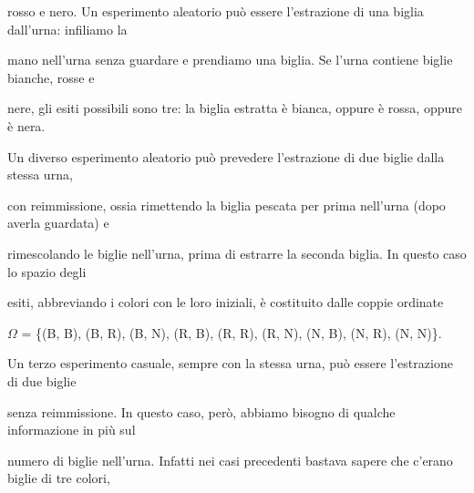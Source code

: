 \documentclass[a4paper,portrait,12pt]{article}
\begin{document}
\begin{flushleft}
rosso e nero. Un esperimento aleatorio pu\`{o} essere l'estrazione di una biglia dall'urna: infiliamo la
\end{flushleft}


\begin{flushleft}
mano nell'urna senza guardare e prendiamo una biglia. Se l'urna contiene biglie bianche, rosse e
\end{flushleft}


\begin{flushleft}
nere, gli esiti possibili sono tre: la biglia estratta \`{e} bianca, oppure \`{e} rossa, oppure \`{e} nera.
\end{flushleft}


\begin{flushleft}
Un diverso esperimento aleatorio pu\`{o} prevedere l'estrazione di due biglie dalla stessa urna,
\end{flushleft}


\begin{flushleft}
con reimmissione, ossia rimettendo la biglia pescata per prima nell'urna (dopo averla guardata) e
\end{flushleft}


\begin{flushleft}
rimescolando le biglie nell'urna, prima di estrarre la seconda biglia. In questo caso lo spazio degli
\end{flushleft}


\begin{flushleft}
esiti, abbreviando i colori con le loro iniziali, \`{e} costituito dalle coppie ordinate
\end{flushleft}


\begin{flushleft}
$\Omega$ = \{(B, B), (B, R), (B, N), (R, B), (R, R), (R, N), (N, B), (N, R), (N, N)\}.
\end{flushleft}


\begin{flushleft}
Un terzo esperimento casuale, sempre con la stessa urna, pu\`{o} essere l'estrazione di due biglie
\end{flushleft}


\begin{flushleft}
senza reimmissione. In questo caso, per\`{o}, abbiamo bisogno di qualche informazione in più sul
\end{flushleft}


\begin{flushleft}
numero di biglie nell'urna. Infatti nei casi precedenti bastava sapere che c'erano biglie di tre colori,
\end{flushleft}
\end{document}
